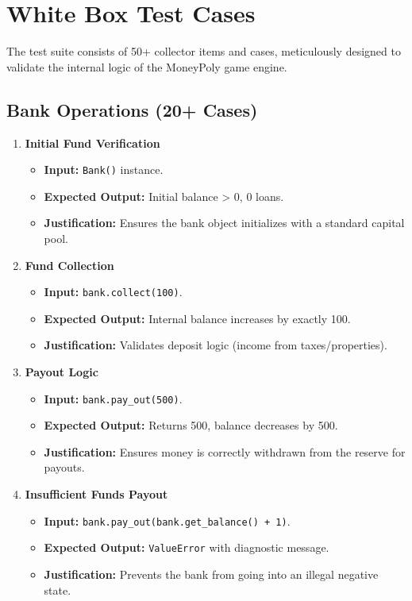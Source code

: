\documentclass{article}
\begin{document}
\section{White Box Test Cases}
The test suite consists of 50+ collector items and cases, meticulously designed to validate the internal logic of the MoneyPoly game engine.

\subsection{Bank Operations (20+ Cases)}
\begin{enumerate}
    \item \textbf{Initial Fund Verification}
    \begin{itemize}
        \item \textbf{Input:} \texttt{Bank()} instance.
        \item \textbf{Expected Output:} Initial balance > 0, 0 loans.
        \item \textbf{Justification:} Ensures the bank object initializes with a standard capital pool.
    \end{itemize}

    \item \textbf{Fund Collection}
    \begin{itemize}
        \item \textbf{Input:} \texttt{bank.collect(100)}.
        \item \textbf{Expected Output:} Internal balance increases by exactly 100.
        \item \textbf{Justification:} Validates deposit logic (income from taxes/properties).
    \end{itemize}

    \item \textbf{Payout Logic}
    \begin{itemize}
        \item \textbf{Input:} \texttt{bank.pay_out(500)}.
        \item \textbf{Expected Output:} Returns 500, balance decreases by 500.
        \item \textbf{Justification:} Ensures money is correctly withdrawn from the reserve for payouts.
    \end{itemize}

    \item \textbf{Insufficient Funds Payout}
    \begin{itemize}
        \item \textbf{Input:} \texttt{bank.pay_out(bank.get_balance() + 1)}.
        \item \textbf{Expected Output:} \texttt{ValueError} with diagnostic message.
        \item \textbf{Justification:} Prevents the bank from going into an illegal negative state.
    \end{itemize}


\end{enumerate}
\end{document}
